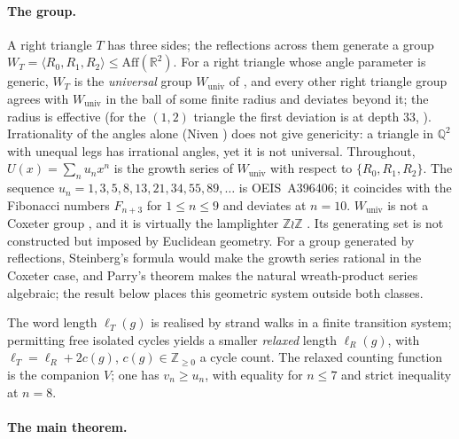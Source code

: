 \documentclass[11pt]{article}
\theoremstyle{plain}
\theoremstyle{definition}
\theoremstyle{remark}
\newcommand{\Z}{\mathbb{Z}}
\newcommand{\Q}{\mathbb{Q}}
\newcommand{\R}{\mathbb{R}}
\theoremstyle{plain}\newtheorem*{maintheorem}{Main Theorem}
\begin{document}
\paragraph{The group.} A right triangle $T$ has three sides; the reflections across them generate a
group $W_T=\langle R_0,R_1,R_2\rangle\le\mathrm{Aff}(\R^2)$. For a right triangle whose angle
parameter is generic, $W_T$ is the \emph{universal} group $W_{\mathrm{univ}}$ of
\cite{Bonfioli2026a}, and every other right triangle group agrees with $W_{\mathrm{univ}}$ in the
ball of some finite radius and deviates beyond it; the radius is effective
\cite[Theorem ``Effective universality'', \textup{thm:effective-universality}]{Bonfioli2026a}
\textup{(}for the $(1,2)$ triangle the first deviation is at depth $33$,
\cite[Theorem ``Sharp uniform universality at depth $32$'', \textup{thm:universality-sharp}]{Bonfioli2026a}\textup{)}.
Irrationality of the angles alone \textup{(}Niven \cite{Niven1956}\textup{)} does not give
genericity: a triangle in $\Q^2$ with unequal legs has irrational angles, yet it is not universal.
Throughout, $U(x)=\sum_nu_nx^n$ is the growth series of $W_{\mathrm{univ}}$ with respect to
$\{R_0,R_1,R_2\}$. The sequence $u_n=1,3,5,8,13,21,34,55,89,\dots$ is \textup{OEIS~A396406}; it
coincides with the Fibonacci numbers $F_{n+3}$ for $1\le n\le9$ and deviates at $n=10$.
$W_{\mathrm{univ}}$ is not a Coxeter group \cite{IsolaPiergallini}, and it is virtually the
lamplighter $\Z\wr\Z$ \cite{Bonfioli2026a}. Its generating set is not constructed but imposed by
Euclidean geometry. For a group generated by reflections, Steinberg's formula would make the
growth series rational in the Coxeter case, and Parry's theorem makes the natural wreath-product
series algebraic; the result below places this geometric system outside both classes.

The word length $\ell_T(g)$ is realised by strand walks in a finite transition system; permitting
free isolated cycles yields a smaller \emph{relaxed} length $\ell_R(g)$, with
$\ell_T=\ell_R+2c(g)$, $c(g)\in\Z_{\ge0}$ a cycle count. The relaxed counting function is the
companion $V$; one has $v_n\ge u_n$, with equality for $n\le7$ and strict inequality at $n=8$.

\paragraph{The main theorem.}
\end{document}
